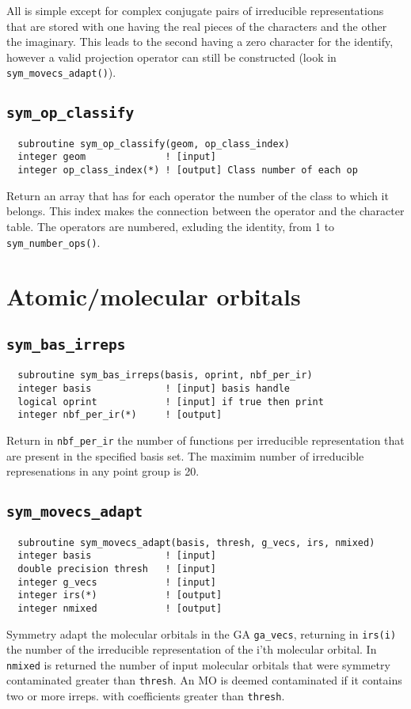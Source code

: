 All is simple except for complex conjugate pairs of irreducible
representations that are stored with one having the real pieces of the
characters and the other the imaginary.  This leads to the second
having a zero character for the identify, however a valid projection
operator can still be constructed (look in \verb+sym_movecs_adapt()+).

\subsection{{\tt sym\_op\_classify}}
\begin{verbatim}
  subroutine sym_op_classify(geom, op_class_index)
  integer geom              ! [input]
  integer op_class_index(*) ! [output] Class number of each op
\end{verbatim}
Return an array that has for each operator the number of the class to
which it belongs.  This index makes the connection between the
operator and the character table.  The operators are numbered,
exluding the identity, from 1 to \verb+sym_number_ops()+.

\section{Atomic/molecular orbitals}

\subsection{{\tt sym\_bas\_irreps}}
\begin{verbatim}
  subroutine sym_bas_irreps(basis, oprint, nbf_per_ir)
  integer basis             ! [input] basis handle
  logical oprint            ! [input] if true then print
  integer nbf_per_ir(*)     ! [output] 
\end{verbatim}
Return in \verb+nbf_per_ir+ the number of functions per irreducible
representation that are present in the specified basis set.  The
maximim number of irreducible represenations in any point group is 20.

\subsection{{\tt sym\_movecs\_adapt}}
\begin{verbatim}
  subroutine sym_movecs_adapt(basis, thresh, g_vecs, irs, nmixed)
  integer basis             ! [input]
  double precision thresh   ! [input]
  integer g_vecs            ! [input]
  integer irs(*)            ! [output]
  integer nmixed            ! [output]
\end{verbatim}
Symmetry adapt the molecular orbitals in the GA \verb+ga_vecs+,
returning in \verb+irs(i)+ the number of the irreducible
representation of the i'th molecular orbital.  In \verb+nmixed+ is
returned the number of input molecular orbitals that were symmetry
contaminated greater than \verb+thresh+.  An MO is deemed contaminated
if it contains two or more irreps. with coefficients greater than
\verb+thresh+.

